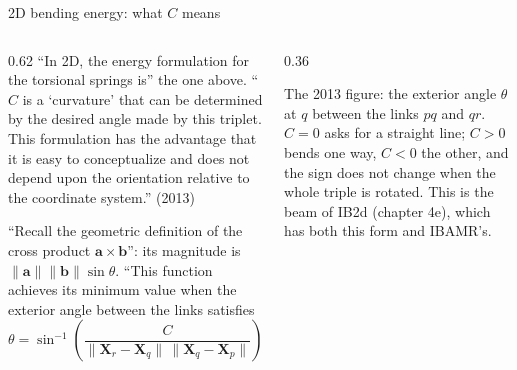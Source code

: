 \documentclass[aspectratio=169,11pt]{beamer}
\begin{document}
\begin{frame}{2D bending energy: what $C$ means}
\label{fr:angle}
\begin{columns}[T,onlytextwidth]
\begin{column}{0.62\textwidth}
\small ``In 2D, the energy formulation for the torsional springs is'' the one above. ``$C$ is a `curvature' that can be determined by the desired angle made by this triplet. This formulation has the advantage that it is easy to conceptualize and does not depend upon the orientation relative to the coordinate system.'' (2013)
\vspace{1mm}

\small {} ``Recall the geometric definition of the cross product $\mathbf{a}\times\mathbf{b}$'': its magnitude is $\|\mathbf{a}\|\|\mathbf{b}\|\sin\theta$. ``This function achieves its minimum value when the exterior angle between the links satisfies
\[
  \theta = \sin^{-1}\!\left(\frac{C}{\|\mathbf{X}_r - \mathbf{X}_q\|\,\|\mathbf{X}_q - \mathbf{X}_p\|}\right).\text{''}
\]
\end{column}
\begin{column}{0.36\textwidth}
\centering
{}

\vspace{2mm}
\footnotesize The 2013 figure: the exterior angle $\theta$ at $q$ between the links $pq$ and $qr$. $C = 0$ asks for a straight line; $C > 0$ bends one way, $C < 0$ the other, and the sign does not change when the whole triple is rotated. This is the beam of IB2d (chapter 4e), which has both this form and IBAMR's.
\end{column}
\end{columns}
\end{frame}
\end{document}

